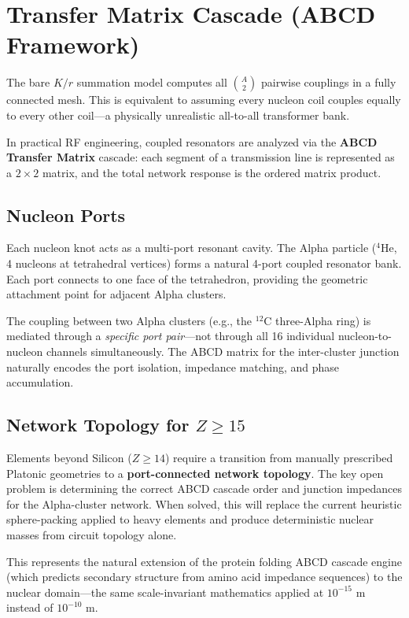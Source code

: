 \section{Transfer Matrix Cascade (ABCD Framework)}
\label{sec:abcd_cascade}
The bare $K/r$ summation model computes all $\binom{A}{2}$ pairwise couplings in a fully connected mesh. This is equivalent to assuming every nucleon coil couples equally to every other coil---a physically unrealistic all-to-all transformer bank.

In practical RF engineering, coupled resonators are analyzed via the \textbf{ABCD Transfer Matrix} cascade: each segment of a transmission line is represented as a $2\times 2$ matrix, and the total network response is the ordered matrix product.

\subsection{Nucleon Ports}
Each nucleon knot acts as a multi-port resonant cavity. The Alpha particle ($^4$He, 4 nucleons at tetrahedral vertices) forms a natural 4-port coupled resonator bank. Each port connects to one face of the tetrahedron, providing the geometric attachment point for adjacent Alpha clusters.

The coupling between two Alpha clusters (e.g., the $^{12}$C three-Alpha ring) is mediated through a \textit{specific port pair}---not through all 16 individual nucleon-to-nucleon channels simultaneously. The ABCD matrix for the inter-cluster junction naturally encodes the port isolation, impedance matching, and phase accumulation.

\subsection{Network Topology for $Z \geq 15$}
Elements beyond Silicon ($Z \geq 14$) require a transition from manually prescribed Platonic geometries to a \textbf{port-connected network topology}. The key open problem is determining the correct ABCD cascade order and junction impedances for the Alpha-cluster network. When solved, this will replace the current heuristic sphere-packing applied to heavy elements and produce deterministic nuclear masses from circuit topology alone.

This represents the natural extension of the protein folding ABCD cascade engine (which predicts secondary structure from amino acid impedance sequences) to the nuclear domain---the same scale-invariant mathematics applied at $10^{-15}$ m instead of $10^{-10}$ m.

